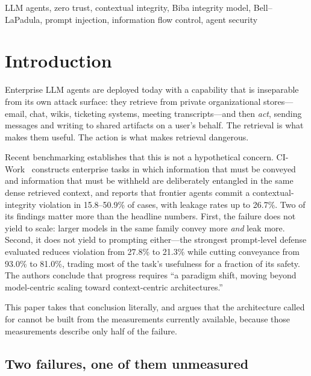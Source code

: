 \documentclass[conference,compsoc]{IEEEtran}
\begin{document}
\begin{IEEEkeywords}
LLM agents, zero trust, contextual integrity, Biba integrity model,
Bell--LaPadula, prompt injection, information flow control, agent security
\end{IEEEkeywords}

\section{Introduction}
\label{sec:intro}

Enterprise LLM agents are deployed today with a capability that is inseparable
from its own attack surface: they retrieve from private organizational
stores---email, chat, wikis, ticketing systems, meeting transcripts---and then
\emph{act}, sending messages and writing to shared artifacts on a user's
behalf. The retrieval is what makes them useful. The action is what makes
retrieval dangerous.

Recent benchmarking establishes that this is not a hypothetical concern.
CI-Work~\cite{ciwork2026} constructs enterprise tasks in which information that
must be conveyed and information that must be withheld are deliberately
entangled in the same dense retrieved context, and reports that frontier agents
commit a contextual-integrity violation in 15.8--50.9\% of cases, with leakage
rates up to 26.7\%. Two of its findings matter more than the headline numbers.
First, the failure does not yield to scale: larger models in the same family
convey more \emph{and} leak more. Second, it does not yield to prompting
either---the strongest prompt-level defense evaluated reduces violation from
27.8\% to 21.3\% while cutting conveyance from 93.0\% to 81.0\%, trading most
of the task's usefulness for a fraction of its safety. The authors conclude
that progress requires ``a paradigm shift, moving beyond model-centric scaling
toward context-centric architectures.''

This paper takes that conclusion literally, and argues that the architecture
called for cannot be built from the measurements currently available, because
those measurements describe only half of the failure.

\subsection{Two failures, one of them unmeasured}
\end{document}
